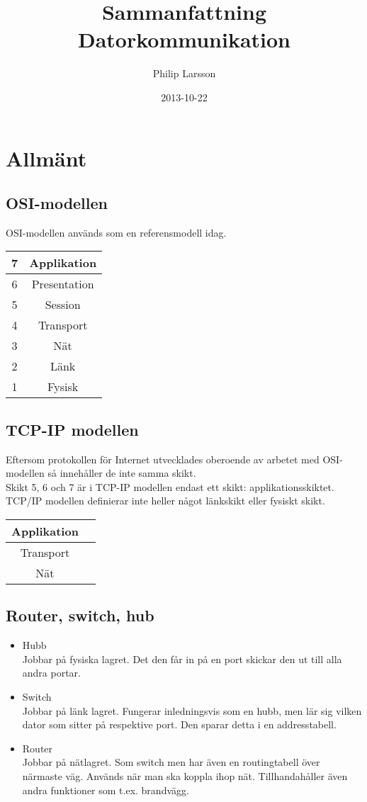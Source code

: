 \documentclass[11pt]{article}
\title{Sammanfattning Datorkommunikation}
\author{Philip Larsson}
\date{2013-10-22}
\begin{document}
\maketitle

\newpage
\tableofcontents
\newpage
\section{Allmänt}
\subsection{OSI-modellen}
OSI-modellen används som en referensmodell idag. \\
\begin{center}
\begin{tabular}{|c|c|}
\hline 
7	&	Applikation \\
\hline
6	&	Presentation \\
\hline
5	& 	Session \\
\hline
4	&	Transport \\
\hline
3	&	Nät	\\
\hline
2	&	Länk	\\
\hline
1	&	Fysisk	\\
\hline
\end{tabular}
\end{center}
\subsection{TCP-IP modellen}
Eftersom protokollen för Internet utvecklades oberoende av arbetet med OSI-modellen så innehåller de inte samma skikt. \\
Skikt 5, 6 och 7 är i TCP-IP modellen endast ett skikt: applikationsskiktet. TCP/IP modellen definierar inte heller något länkskikt eller fysiskt skikt.
\begin{center}
\begin{tabular}{|c|c|}
\hline 
Applikation \\
\hline
Transport \\
\hline
Nät	\\
\hline
\end{tabular}
\end{center}
\subsection{Router, switch, hub}
\begin{itemize}
\item{Hubb\\
	Jobbar på fysiska lagret. Det den får in på en port skickar den ut till alla andra portar.}
\item{Switch \\
	Jobbar på länk lagret. Fungerar inledningsvis som en hubb, men lär sig vilken dator som sitter på respektive port. Den sparar detta i en addresstabell.}
\item{Router \\
	Jobbar på nätlagret. Som switch men har även en routingtabell över närmaste väg. Används när man ska koppla ihop nät. Tillhandahåller även andra funktioner som t.ex. brandvägg.}
\end{itemize}
\end{document}
